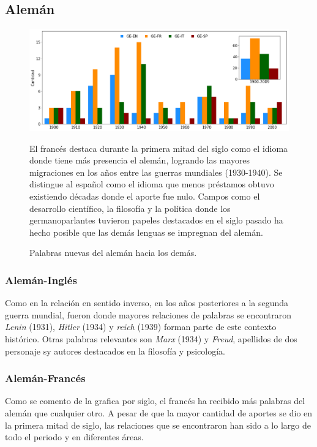 \subsection{Alemán}%

\begin{figure}[h!]
	\centering
	\includegraphics[scale=.38]{Cap_3/NC_GE.png}
	\label{fig.NC_GE}
	\caption{Palabras nuevas del alemán hacia los demás.}
	\smallskip
	\small
	El francés destaca durante la primera mitad del siglo como el idioma donde tiene más presencia el alemán, logrando las mayores migraciones en los años entre las guerras mundiales (1930-1940). Se distingue al español como el idioma que menos préstamos obtuvo  existiendo décadas donde el aporte fue nulo.  Campos como el desarrollo científico, la filosofía  y la política donde los germanoparlantes tuvieron papeles destacados en el siglo pasado ha hecho posible que las demás lenguas se impregnan del alemán.
\end{figure}




\subsubsection*{Alemán-Inglés}%

Como en la relación en sentido inverso, en los años posteriores a la segunda guerra mundial,  fueron donde mayores relaciones de palabras se encontraron  \textit{Lenin} (1931), \textit{Hitler} (1934) y \textit{reich} (1939) forman parte  de este contexto histórico.  Otras palabras relevantes son \textit{Marx} (1934) y \textit{Freud}, apellidos de dos personaje sy autores destacados en la filosofía y psicología. 


\subsubsection*{Alemán-Francés}%

Como se comento de la grafica por siglo, el francés ha recibido más palabras del alemán que cualquier otro. A pesar de que la mayor cantidad de aportes se dio en la primera mitad de siglo, las relaciones que se encontraron han sido a lo largo de todo el periodo y en diferentes áreas. 

